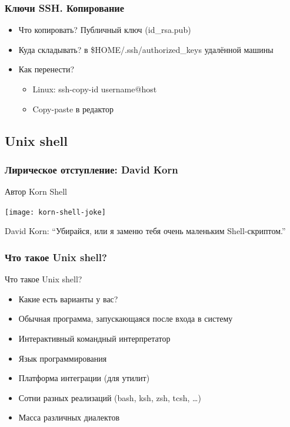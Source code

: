 \begin{frame}
  \frametitle{Ключи SSH. Копирование}

  \begin{itemize}
    \item \alert{Что копировать?} Публичный ключ (id\_rsa.pub)  \pause
    \item \alert{Куда складывать?} в \$HOME/.ssh/authorized\_keys \newline удалённой машины \pause
    \item \alert{Как перенести?} \pause
      \begin{itemize} 
	\item Linux: ssh-copy-id username@host \pause
	\item Copy-paste в редактор \pause
      \end{itemize}
  \end{itemize}

\end{frame}

\subsection{Unix shell}
\begin{frame}
  \frametitle{Лирическое отступление: David Korn}
  \begin{center}
    Автор Korn Shell

    \texttt{[image: korn-shell-joke]} 

    David Korn: ``Убирайся, или я заменю тебя очень маленьким Shell-скриптом.''
  \end{center}
\end{frame}

\begin{frame}
  \frametitle{Что такое Unix shell?}
  
  \alert{Что такое Unix shell?}

  \begin{itemize}
    \item Какие есть варианты у вас? \pause
    \item Обычная программа, запускающаяся после входа в систему \pause
    \item Интерактивный командный интерпретатор \pause
    \item Язык программирования \pause
    \item Платформа интеграции (для утилит) \pause
    \item Сотни разных реализаций (bash, ksh, zsh, tcsh, \ldots ) \pause
    \item Масса различных диалектов
  \end{itemize}

\end{frame}

